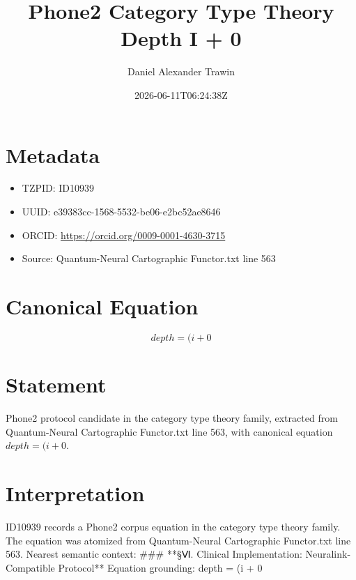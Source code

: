 \documentclass[11pt]{article}
\title{Phone2 Category Type Theory Depth I + 0}
\author{Daniel Alexander Trawin}
\date{2026-06-11T06:24:38Z}
\begin{document}
\maketitle
\section*{Metadata}
\begin{itemize}
\item TZPID: ID10939
\item UUID: e39383cc-1568-5532-be06-e2bc52ae8646
\item ORCID: \url{https://orcid.org/0009-0001-4630-3715}
\item Source: Quantum-Neural Cartographic Functor.txt line 563
\end{itemize}
\section*{Canonical Equation}
\[
depth = (i + 0
\]
\section*{Statement}
Phone2 protocol candidate in the category type theory family, extracted from Quantum-Neural Cartographic Functor.txt line 563, with canonical equation $depth = (i + 0$.
\section*{Interpretation}
ID10939 records a Phone2 corpus equation in the category type theory family. The equation was atomized from Quantum-Neural Cartographic Functor.txt line 563. Nearest semantic context: ### **§Ⅵ. Clinical Implementation: Neuralink-Compatible Protocol** Equation grounding: depth = (i + 0
\end{document}
